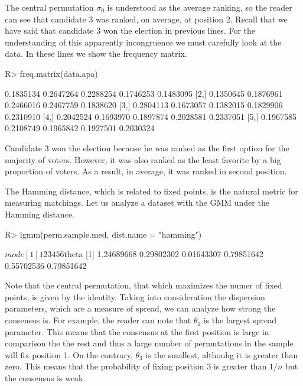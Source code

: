 \documentclass[article,nojss]{jss}
\begin{document}
The central permutation $\sigma_0$ is understood as the average ranking, so the reader can see that candidate 3 was ranked, on average, at position 2. Recall that we have said that candidate 3 won the election in previous lines. For the understanding of this apparently incongruence we must carefully look at the data. In these lines we show the frequency matrix. 
\begin{Schunk}
\begin{Sinput}
R> freq.matrix(data.apa)
\end{Sinput}
\begin{Soutput}
          [,1]      [,2]      [,3]      [,4]      [,5]
[1,] 0.1835134 0.2647264 0.2288254 0.1746253 0.1483095
[2,] 0.1350645 0.1876961 0.2466016 0.2467759 0.1838620
[3,] 0.2804113 0.1673057 0.1382015 0.1829906 0.2310910
[4,] 0.2042524 0.1693970 0.1897874 0.2028581 0.2337051
[5,] 0.1967585 0.2108749 0.1965842 0.1927501 0.2030324
\end{Soutput}
\end{Schunk}

Candidate 3 won the election because he was ranked as the first option for the majority of voters. However, it was also ranked as the least favorite by a big proportion of voters. As a result, in average, it was ranked in second position. 

The Hamming distance, which is related to fixed points, is the natural metric for measuring matchings. Let us analyze a dataset with the GMM under the Hamming distance. 
\begin{Schunk}
\begin{Sinput}
R> lgmm(perm.sample.med, dist.name = "hamming")
\end{Sinput}
\begin{Soutput}
$mode
[1] 1 2 3 4 5 6

$theta
[1] 1.24689668 0.29802302 0.01643307 0.79851642 0.55702536 0.79851642
\end{Soutput}
\end{Schunk}

Note that the central permutation, that which maximizes the numer of fixed points, is given by the identity. Taking into consideration the dispersion parameters, which are a measure of spread, we can analyze how strong the consensus is. For example, the reader can note that $\theta_1$ is the largest spread parameter. This means that the consensus at the first position is large in comparison the the rest and thus a large number of permutations in the sample will fix position 1. On the contrary, $\theta_3$ is the smallest, althouhg it is greater than zero. This means that the probability of fixing position 3 is greater than $1/n$ but the consensus is weak. 
\end{document}
